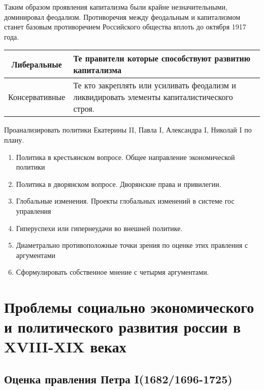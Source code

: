 \documentclass[a4paper]{article}
\begin{document}
Таким образом проявления капитализма были крайне незначительными, доминировал феодализм. Противоречия между феодальным и капитализмом станет базовым противоречием Российского общества вплоть до октября 1917 года.

\begin{table}[H]
    \centering
    \begin{tabular}{|c|l|}
    \hline
        Либеральные &
        \begin{minipage}{4in}
            Те правители которые способствуют развитию капитализма
        \end{minipage}\\
    \hline
        Консервативные &
        \begin{minipage}{4in}
            Те кто закреплять или усиливать феодализм и ликвидировать элементы капиталистического строя.
        \end{minipage}\\
    \hline
    \end{tabular}
\end{table}
Проанализировать политики Екатерины II, Павла I, Александра I, Николай I по плану.

\begin{enumerate}
    \item Политика в крестьянском вопросе. Общее направление экономической политики
    \item Политика в дворянском вопросе. Дворянские права и привилегии.
    \item Глобальные изменения. Проекты глобальных изменений в системе гос управления
    \item Гиперуспехи или гипернеудачи во внешней политике.
    \item Диаметрально противоположные точки зрения по оценке этих правления с аргументами
    \item Сформулировать собственное мнение с четырмя аргументами.
\end{enumerate}

\section{Проблемы социально экономического и политического развития россии в XVIII-XIX веках}

\subsection{Оценка правления Петра I(1682/1696-1725)}
\end{document}
